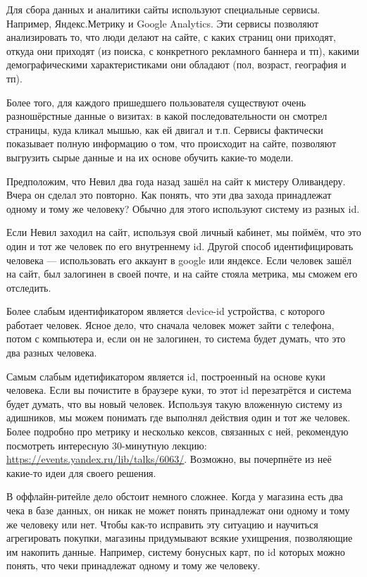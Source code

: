 \documentclass[12pt, a4paper, oneside]{article}
\begin{document}
Для сбора данных и аналитики сайты используют специальные сервисы. Например, Яндекс.Метрику и Google Analytics. Эти сервисы позволяют анализировать то, что люди делают на сайте, с каких страниц они приходят, откуда они приходят (из поиска, с конкретного рекламного баннера и тп), какими демографическими характеристиками они обладают (пол, возраст, география и тп). 

Более того, для каждого пришедшего пользователя существуют очень разношёрстные данные о визитах: в какой последовательности он смотрел страницы, куда кликал мышью, как ей двигал и т.п.  Сервисы фактически показывает полную информацию о том, что происходит на сайте, позволяют выгрузить сырые данные и на их основе обучить какие-то модели. 

Предположим, что Невил два года назад зашёл на сайт к мистеру Оливандеру. Вчера он сделал это повторно. Как понять, что эти два захода принадлежат одному и тому же человеку? Обычно для этого используют систему из разных id. 

Если Невил заходил на сайт, используя свой личный кабинет, мы поймём, что это один и тот же человек по его внутреннему id. Другой способ идентифицировать человека --- использовать его аккаунт в google или яндексе.  Если человек зашёл на сайт, был залогинен в своей почте, и на сайте стояла метрика, мы сможем его отследить. 

Более слабым идентификатором является device-id устройства, с которого работает человек. Ясное дело, что сначала человек может зайти с телефона, потом с компьютера и, если он не залогинен, то система будет думать, что это два разных человека. 

Самым слабым идетификатором является id, построенный на основе куки человека. Если вы почистите в браузере куки, то этот id перезатрётся и система будет думать, что вы новый человек.  Используя такую вложенную систему из адишников, мы можем понимать где выполнял действия один и тот же человек. Более подробно про метрику и несколько кексов, связанных с ней,  рекомендую посмотреть интересную 30-минутную лекцию: \url{ https://events.yandex.ru/lib/talks/6063/}.  Возможно, вы почерпнёте из неё какие-то идеи для своего решения. 

В оффлайн-ритейле дело обстоит немного сложнее. Когда у магазина есть два чека в базе данных, он никак не может понять принадлежат они одному и тому же человеку или нет. Чтобы как-то исправить эту ситуацию и научиться агрегировать покупки, магазины придумывают всякие ухищрения, позволяющие им накопить данные. Например, систему бонусных карт, по id которых можно понять, что чеки принадлежат одному и тому же человеку. 
\end{document}

